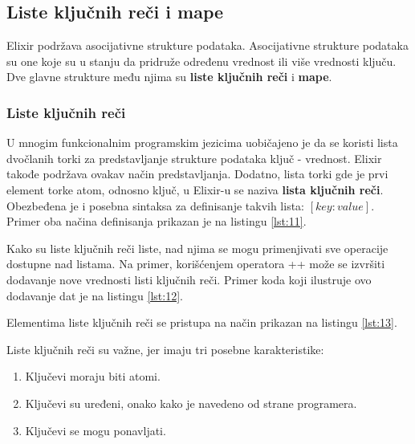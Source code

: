\documentclass[12pt,oneside]{memoir}
\begin{document}
\subsection{Liste ključnih reči i mape}
\label{odeljak:ključneReči}
Elixir podržava asocijativne strukture podataka. Asocijativne strukture podataka su one koje su u stanju da pridruže određenu vrednost ili više vrednosti ključu. Dve glavne strukture među njima su \textbf{liste ključnih reči} i \textbf{mape}.

\subsubsection{Liste ključnih reči}
U mnogim funkcionalnim programskim jezicima uobičajeno je da se koristi lista dvočlanih torki za predstavljanje strukture podataka ključ - vrednost. Elixir takođe podržava ovakav način predstavljanja. Dodatno, lista torki gde je prvi element torke atom, odnosno ključ, u Elixir-u se naziva \textbf{lista ključnih reči}. Obezbeđena je i posebna sintaksa za definisanje takvih lista: $[key: value]$. Primer oba načina definisanja prikazan je na listingu \ref{lst:11}.



Kako su liste ključnih reči liste, nad njima se mogu primenjivati sve operacije dostupne nad listama. Na primer, korišćenjem operatora ++ može se izvršiti dodavanje nove vrednosti listi ključnih reči. Primer koda koji ilustruje ovo dodavanje dat je na listingu \ref{lst:12}.



Elementima liste ključnih reči se pristupa na način prikazan na listingu \ref{lst:13}.



Liste ključnih reči su važne, jer imaju tri posebne karakteristike:
\begin{enumerate}
\itemsep0em 
\item{Ključevi moraju biti atomi.}
\item{Ključevi su uređeni, onako kako je navedeno od strane programera.}
\item{Ključevi se mogu ponavljati.}
\end{enumerate}
\end{document}
